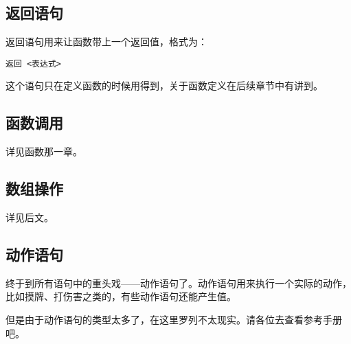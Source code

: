 \subsection{返回语句}

返回语句用来让函数带上一个返回值，格式为：

\begin{verbatim}
返回 <表达式>
\end{verbatim}

这个语句只在定义函数的时候用得到，关于函数定义在后续章节中有讲到。

\subsection{函数调用}

详见函数那一章。

\subsection{数组操作}

详见后文。

\subsection{动作语句}

终于到所有语句中的重头戏——动作语句了。动作语句用来执行一个实际的动作，比如摸牌、打伤害之类的，有些动作语句还能产生值。

但是由于动作语句的类型太多了，在这里罗列不太现实。请各位去查看参考手册吧。


